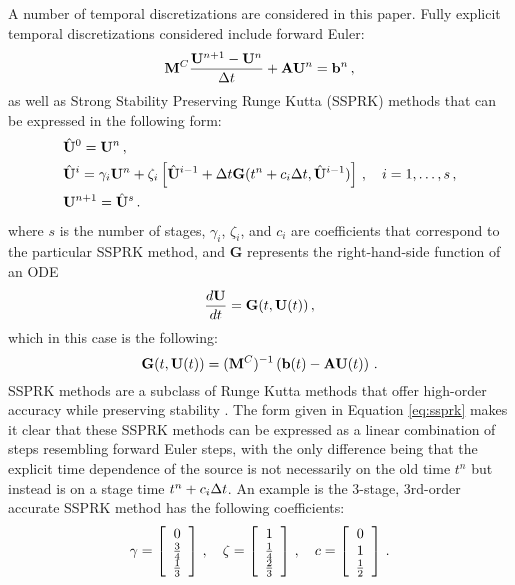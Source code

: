 A number of temporal discretizations are considered in this paper.
Fully explicit temporal discretizations considered include forward Euler:
\begin{equation}
  \mathbf{M}^C\frac{\mathbf{U}^{n+1}-\mathbf{U}^n}{\Delta t} + \mathbf{A}\mathbf{U}^n = \mathbf{b}^n \,,
\end{equation}
as well as Strong Stability Preserving Runge Kutta (SSPRK) methods that
can be expressed in the following form:
\begin{subequations}\label{eq:ssprk}
\begin{align}
  & \hat{\mathbf{U}}^0 = \mathbf{U}^n \,, \\
  & \hat{\mathbf{U}}^i = \gamma_i \mathbf{U}^n + \zeta_i \left[
      \hat{\mathbf{U}}^{i-1}
      + \Delta t\mathbf{G}(t^n+c_i\Delta t, \hat{\mathbf{U}}^{i-1})\right]
    \,, \quad
    i = 1,\ldots,s
    \,, \\
  & \mathbf{U}^{n+1} = \hat{\mathbf{U}}^s \,.
\end{align}
\end{subequations}
where $s$ is the number of stages, $\gamma_i$, $\zeta_i$, and $c_i$ are
coefficients that correspond to the particular SSPRK method, and
$\mathbf{G}$ represents the right-hand-side function of an ODE
\begin{equation}
  \frac{d\mathbf{U}}{dt} = \mathbf{G}(t,\mathbf{U}(t)) \,,
\end{equation}
which in this case is the following:
\begin{equation}
  \mathbf{G}(t,\mathbf{U}(t)) = (\mathbf{M}^C)^{-1}
    \left(\mathbf{b}(t) - \mathbf{A}\mathbf{U}(t)\right) \,.
\end{equation}
SSPRK methods are a subclass of Runge Kutta methods that offer high-order
accuracy while preserving stability \cite{gottlieb}\cite{macdonald}.
The form given in Equation \eqref{eq:ssprk} makes it clear that these
SSPRK methods can be expressed as a linear combination of steps resembling
forward Euler steps, with the only difference being that the explicit
time dependence of the source is not necessarily on the old time $t^n$ but
instead is on a stage time $t^n + c_i\Delta t$.
An example is the 3-stage, 3rd-order accurate SSPRK
method has the following coefficients:
\begin{equation}
  \gamma = \left[\begin{array}{c}
    0\\\frac{3}{4}\\\frac{1}{3}\end{array}\right]
  \,, \quad
  \zeta = \left[\begin{array}{c}
    1\\\frac{1}{4}\\\frac{2}{3}\end{array}\right]
  \,, \quad
  c = \left[\begin{array}{c}0\\1\\\frac{1}{2}\end{array}\right] \,.
\end{equation}

